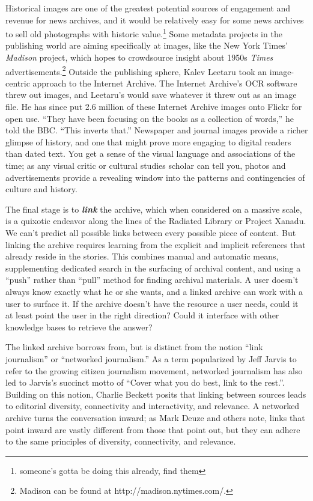 Historical images are one of the greatest potential sources of engagement and revenue for news archives, and it would be relatively easy for some news archives to sell old photographs with historic value.\footnote{someone's gotta be doing this already, find them} Some metadata projects in the publishing world are aiming specifically at images, like the New York Times' \emph{Madison} project, which hopes to crowdsource insight about 1950s \emph{Times} advertisements.\footnote{Madison can be found at http://madison.nytimes.com/.} Outside the publishing sphere, Kalev Leetaru took an image-centric approach to the Internet Archive. The Internet Archive's OCR software threw out images, and Leetaru's would save whatever it threw out as an image file. He has since put 2.6 million of these Internet Archive images onto Flickr for open use. ``They have been focusing on the books as a collection of words,'' he told the BBC. ``This inverts that.''\autocite{kelion_millions_2014} Newspaper and journal images provide a richer glimpse of history, and one that might prove more engaging to digital readers than dated text. You get a sense of the visual language and associations of the time; as any visual critic or cultural studies scholar can tell you, photos and advertisements provide a revealing window into the patterns and contingencies of culture and history.\autocite{sontag_photography_1977,barthes_rhetoric_1978}

The final stage is to \textbf{\emph{link}} the archive, which when considered on a massive scale, is a quixotic endeavor along the lines of the Radiated Library or Project Xanadu. We can't predict all possible links between every possible piece of content. But linking the archive requires learning from the explicit and implicit references that already reside in the stories. This combines manual and automatic means, supplementing dedicated search in the surfacing of archival content, and using a ``push'' rather than ``pull'' method for finding archival materials. A user doesn't always know exactly what he or she wants, and a linked archive can work with a user to surface it. If the archive doesn't have the resource a user needs, could it at least point the user in the right direction? Could it interface with other knowledge bases to retrieve the answer?

The linked archive borrows from, but is distinct from the notion ``link journalism'' or ``networked journalism.'' As a term popularized by Jeff Jarvis to refer to the growing citizen journalism movement, networked journalism has also led to Jarvis's succinct motto of ``Cover what you do best, link to the rest.''\autocite{jarvis_new_2007,jarvis_networked_2006}. Building on this notion, Charlie Beckett posits that linking between sources leads to editorial diversity, connectivity and interactivity, and relevance.\autocite{beckett_editorial_2010} A networked archive turns the conversation inward; as Mark Deuze and others note, links that point inward are vastly different from those that point out, but they can adhere to the same principles of diversity, connectivity, and relevance.

